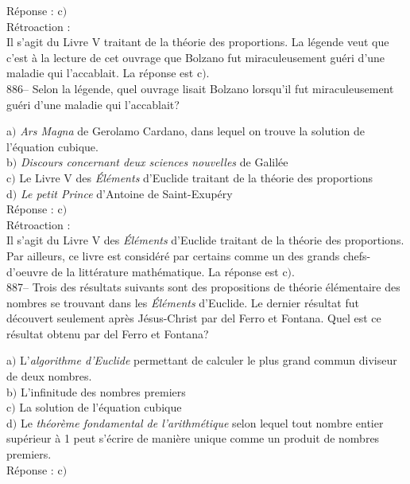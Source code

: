 ﻿\documentclass[letterpaper, 12pt]{article}
\begin{document}
R\'eponse : c$)$\\

R\'etroaction :\\
Il s'agit du Livre V traitant de la th\'eorie des proportions.
La l\'egende veut que c'est \`a la lecture de cet ouvrage que Bolzano fut
miraculeusement gu\'eri d'une maladie qui l'accablait. La r\'eponse est
c$)$.\\

886-- Selon la l\'egende, quel ouvrage lisait Bolzano lorsqu'il fut
miraculeusement gu\'eri d'une maladie qui l'accablait?

a$)$ {\sl Ars Magna} de Gerolamo Cardano, dans lequel on trouve la solution
de l'\'equation cubique. \\
b$)$ {\sl Discours concernant deux sciences nouvelles} de Galil\'ee  \\
c$)$ Le Livre V des {\sl \'El\'ements} d'Euclide traitant de la th\'eorie
des proportions \\
d$)$ {\sl Le petit Prince} d'Antoine de Saint-Exup\'ery  \\

R\'eponse : c$)$\\

R\'etroaction :\\
Il s'agit du Livre V des {\sl \'El\'ements} d'Euclide traitant de la
th\'eorie des proportions.
Par ailleurs, ce livre est consid\'er\'e par certains comme un
des grands chefs-d'oeuvre de la litt\'erature math\'ematique. La r\'eponse
est c$)$.\\

887-- Trois des r\'esultats suivants sont des propositions de
th\'eorie \'el\'ementaire des nombres se trouvant dans les {\sl
\'El\'ements} d'Euclide. Le dernier r\'esultat fut d\'ecouvert
seulement apr\`es J\'esus-Christ par del Ferro et Fontana. Quel est
ce r\'esultat obtenu par del Ferro et Fontana?

a$)$ L'{\sl algorithme d'Euclide} permettant de calculer le plus grand
commun diviseur de deux nombres. \\
b$)$ L'infinitude des nombres premiers  \\
c$)$ La solution de l'\'equation cubique \\
d$)$ Le {\sl th\'eor\`eme fondamental de l'arithm\'etique} selon lequel tout
nombre entier sup\'erieur \`a 1 peut
s'\'ecrire de mani\`ere unique comme un produit de nombres premiers.\\

R\'eponse : c$)$\\
\end{document}
